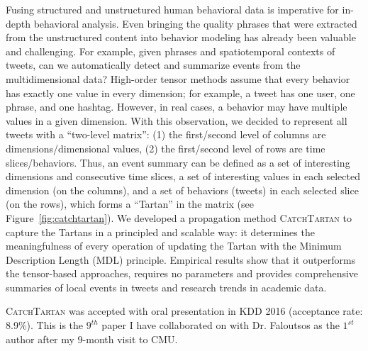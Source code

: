 \documentclass[10.5pt]{article}
\begin{document}
Fusing structured and unstructured human behavioral data is imperative for in-depth behavioral analysis. Even bringing the quality phrases that were extracted from the unstructured content into behavior modeling has already been valuable and challenging. For example, given phrases and spatiotemporal contexts of tweets, can we automatically detect and summarize events from the multidimensional data? High-order tensor methods assume that every behavior has exactly one value in every dimension; for example, a tweet has one user, one phrase, and one hashtag. However, in real cases, a behavior may have multiple values in a given dimension. With this observation, we decided to represent all tweets with a ``two-level matrix'': (1) the first/second level of columns are dimensions/dimensional values, (2) the first/second level of rows are time slices/behaviors. Thus, an event summary can be defined as a set of interesting dimensions and consecutive time slices, a set of interesting values in each selected dimension (on the columns), and a set of behaviors (tweets) in each selected slice (on the rows), which forms a ``Tartan'' in the matrix (see Figure~\ref{fig:catchtartan}). We developed a propagation method \textsc{CatchTartan} \cite{jiang2016catchtartan} to capture the Tartans in a principled and scalable way: it determines the meaningfulness of every operation of updating the Tartan with the Minimum Description Length (MDL) principle. Empirical results show that it outperforms the tensor-based approaches, requires no parameters and provides comprehensive summaries of local events in tweets and research trends in academic data.

\begin{compactitem}
\item \textsc{CatchTartan} \cite{jiang2016catchtartan} was accepted with oral presentation in KDD 2016 (acceptance rate: 8.9\%).
This is the \underline{$9^{th}$} paper I have collaborated on with Dr. Faloutsos as the $1^{st}$ author after my \underline{$9$}-month visit to CMU.
\end{compactitem}

\vskip 0.05in
\vskip 0.01in
\end{document}
